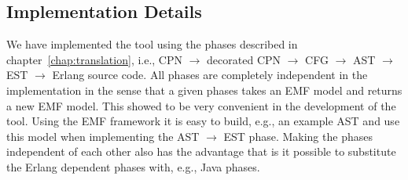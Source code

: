 \subsection{Implementation Details}
We have implemented the tool using the phases described in chapter~\ref{chap:translation}, i.e., CPN $\rightarrow$ decorated CPN $\rightarrow$ CFG $\rightarrow$ AST $\rightarrow$ EST $\rightarrow$ Erlang source code. All phases are completely independent in the implementation in the sense that a given phases takes an EMF model and returns a new EMF model. This showed to be very convenient in the development of the tool. Using the EMF framework it is easy to build, e.g., an example AST and use this model when implementing the AST $\rightarrow$ EST phase. Making the phases independent of each other also has the advantage that is it possible to substitute the Erlang dependent phases with, e.g., Java phases.
